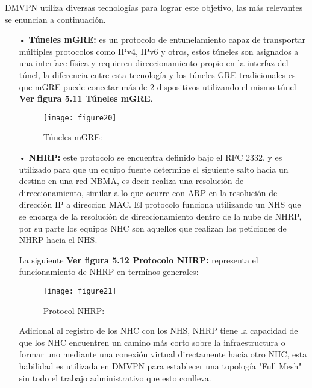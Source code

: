 DMVPN utiliza diversas tecnologías para lograr este objetivo, las más relevantes se enuncian a continuación.
\begin{itemize}
\item[•]\textbf{Túneles mGRE:} es un protocolo de entunelamiento capaz de transportar múltiples protocolos como IPv4, IPv6 y otros, estos túneles son asignados a una interface física y requieren direccionamiento propio en la interfaz del túnel, la diferencia entre esta tecnología y los túneles GRE tradicionales es que mGRE puede conectar más de 2 dispositivos utilizando el mismo túnel \textbf{Ver figura 5.11 Túneles mGRE}.
\begin{figure}[htbp]
  \centering
    {\texttt{[image: figure20]}}%
  \caption{Túneles mGRE:}
  \label{fig:fig2subfig}
\end{figure}
\item[•]\textbf{NHRP:} este protocolo se encuentra definido bajo el RFC 2332, y es utilizado para que un equipo fuente determine el siguiente salto hacia un destino en una red NBMA, es decir realiza una resolución de direccionamiento, similar a lo que ocurre con ARP en la resolución de dirección IP a direccion MAC. El protocolo funciona utilizando un NHS que se encarga de la resolución de direccionamiento dentro de la nube de NHRP, por su parte los equipos NHC son aquellos que realizan las peticiones de NHRP hacia el NHS.

La siguiente \textbf{Ver figura 5.12 Protocolo NHRP:} representa el funcionamiento de NHRP en terminos generales:

\begin{figure}[htbp]
  \centering
    {\texttt{[image: figure21]}}%
  \caption{Protocol NHRP:}
  \label{fig:fig2subfig}
\end{figure}
Adicional al registro de los NHC con los NHS, NHRP tiene la capacidad de que los NHC encuentren un camino más corto sobre la infraestructura o formar uno mediante una conexión virtual directamente hacia otro NHC, esta habilidad es utilizada en DMVPN para establecer una topología "Full Mesh" sin todo el trabajo administrativo que esto conlleva.
\end{itemize}

